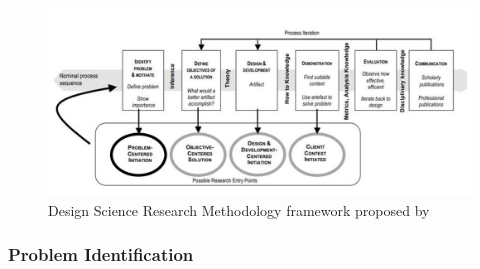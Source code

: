 \begin{figure}[htpb]
  \centering
  \includegraphics[width=\textwidth]{figures/dsrm.png}
  \caption{Design Science Research Methodology framework proposed by \cite{Peffers.2007}} \label{fig:dsrm}
\end{figure}

\subsubsection{Problem Identification}

